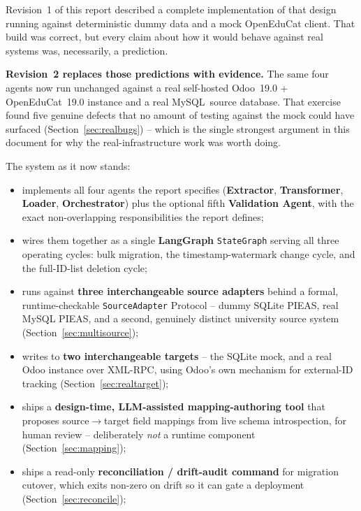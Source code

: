 \documentclass[11pt,a4paper]{article}
\newcommand{\ttu}[1]{\texttt{\detokenize{#1}}}
\begin{document}
Revision~1 of this report described a complete implementation of that design running against
deterministic dummy data and a mock OpenEduCat client. That build was correct, but every claim
about how it would behave against real systems was, necessarily, a prediction.

\textbf{Revision~2 replaces those predictions with evidence.} The same four agents now run
unchanged against a real self-hosted Odoo~19.0 + OpenEduCat~19.0 instance and a real
MySQL~source database. That exercise found five genuine defects that no amount of testing
against the mock could have surfaced (Section~\ref{sec:realbugs}) -- which is the single
strongest argument in this document for why the real-infrastructure work was worth doing.

The system as it now stands:

\begin{itemize}[leftmargin=1.4em]
    \item implements all four agents the report specifies (\textbf{Extractor}, \textbf{Transformer},
          \textbf{Loader}, \textbf{Orchestrator}) plus the optional fifth \textbf{Validation Agent},
          with the exact non-overlapping responsibilities the report defines;
    \item wires them together as a single \textbf{LangGraph} \texttt{StateGraph} serving all
          three operating cycles: bulk migration, the timestamp-watermark change cycle, and the
          full-ID-list deletion cycle;
    \item runs against \textbf{three interchangeable source adapters} behind a formal, runtime-checkable
          \texttt{SourceAdapter} Protocol -- dummy SQLite PIEAS, real MySQL PIEAS, and a second,
          genuinely distinct university source system (Section~\ref{sec:multisource});
    \item writes to \textbf{two interchangeable targets} -- the SQLite mock, and a real Odoo
          instance over XML-RPC, using Odoo's own \ttu{ir.model.data} mechanism for external-ID
          tracking (Section~\ref{sec:realtarget});
    \item ships a \textbf{design-time, LLM-assisted mapping-authoring tool} that proposes
          source$\rightarrow$target field mappings from live schema introspection, for human review --
          deliberately \emph{not} a runtime component (Section~\ref{sec:mapping});
    \item ships a read-only \textbf{reconciliation / drift-audit command} for migration cutover,
          which exits non-zero on drift so it can gate a deployment (Section~\ref{sec:reconcile});

\end{itemize}
\end{document}
